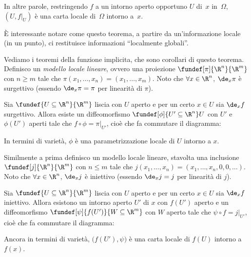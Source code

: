 In altre parole,
restringendo $f$ a un intorno aperto opportuno $U$ di~$x$ in~$\Omega$,
$(U,f|_U)$ è una carta locale di~$\Omega$ intorno a~$x$.

È interessante notare come questo teorema,
a partire da un'informazione locale (in un punto),
ci restituisce informazioni ``localmente globali''.

Vediamo i teoremi della funzione implicita,
che sono corollari di questo teorema.
Definisco un \emph{modello locale lineare},
ovvero una proiezione $\fundef[\pi]{\R^n}{\R^m}$ con $n \ge m$
tale che $\pi(x_1,\dots,x_n)=(x_1,\dots,x_m)$.
Noto che $\forall x \in \R^n$, $\de_x\pi$ è surgettivo
(essendo $\de_x\pi=\pi$ per linearità di $\pi$).

\begin{fat}
	\label{th:funimpsurg}
	Sia $\fundef{U\subseteq\R^n}{\R^m}$ liscia con $U$ aperto
	e per un certo $x\in U$ sia $\de_xf$ surgettivo.
	Allora esiste un diffeomorfismo $\fundef[\phi]{U'\subseteq\R^n}U$
	con $U'$ e $\phi(U')$ aperti
	tale che $f\circ\phi=\pi|_{U'}$, cioè che fa commutare il diagramma:
	\begin{center}
		
	\end{center}
\end{fat}

In termini di varietà, $\phi$ è una parametrizzazione locale di $U$ intorno a $x$.

Similmente a prima definisco un modello locale lineare,
stavolta una inclusione $\fundef[j]{\R^n}{\R^m}$ con $n \le m$
tale che $j(x_1,\dots,x_n)=(x_1,\dots,x_n,0,0,\dots)$.
Noto che $\forall x \in \R^n$, $\de_xj$ è iniettivo
(essendo $\de_xj=j$ per linearità di $j$).

\begin{fat}
	Sia $\fundef{U\subseteq\R^n}{\R^m}$ liscia con $U$ aperto
	e per un certo $x\in U$ sia $\de_xf$ iniettivo.
	Allora esistono un intorno aperto $U'$ di $x$ con $f(U')$ aperto
	e un diffeomorfismo $\fundef[\psi]{f(U')}{W\subseteq\R^m}$ con $W$ aperto
	tale che $\psi\circ f=j|_{U'}$, cioè che fa commutare il diagramma:
	\begin{center}
		
	\end{center}
\end{fat}

Ancora in termini di varietà, $\big(f(U'),\psi\big)$ è una carta locale di $f(U)$ intorno a~$f(x)$.

